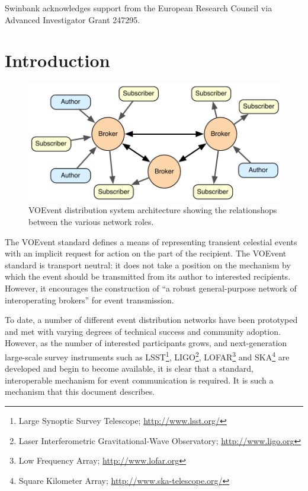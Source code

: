 \documentclass[a4paper,11pt]{ivoa}
\begin{document}
Swinbank acknowledges support from the European Research Council via Advanced
Investigator Grant 247295.

\newpage

\tableofcontents

\newpage

\section{Introduction}
\label{sec:intro}

\begin{figure}
  \begin{center}
  \includegraphics{figures/network.pdf}
  \end{center}

  \caption{VOEvent distribution system architecture showing the relationshops
  between the various network roles.}

  \label{fig:network}
\end{figure}

The VOEvent standard \citep{Seaman:2011} defines a means of representing
transient celestial events with an implicit request for action on the part of
the recipient. The VOEvent standard is transport neutral: it does not take a
position on the mechanism by which the event should be transmitted from its
author to interested recipients. However, it encourages the construction of
``a robust general-purpose network of interoperating brokers'' for event
transmission.

To date, a number of different event distribution networks have been
prototyped and met with varying degrees of technical success and community
adoption. However, as the number of interested participants grows, and
next-generation large-scale survey instruments such as LSST\footnote{Large
Synoptic Survey Telescope; \url{http://www.lsst.org/}}, LIGO\footnote{Laser
Interferometric Gravitational-Wave Observatory; \url{http://www.ligo.org}},
LOFAR\footnote{Low Frequency Array; \url{http://www.lofar.org}} and
SKA\footnote{Square Kilometer Array; \url{http://www.ska-telescope.org/}} are
developed and begin to become available, it is clear that a standard,
interoperable mechanism for event communication is required. It is such a
mechanism that this document describes.
\end{document}
